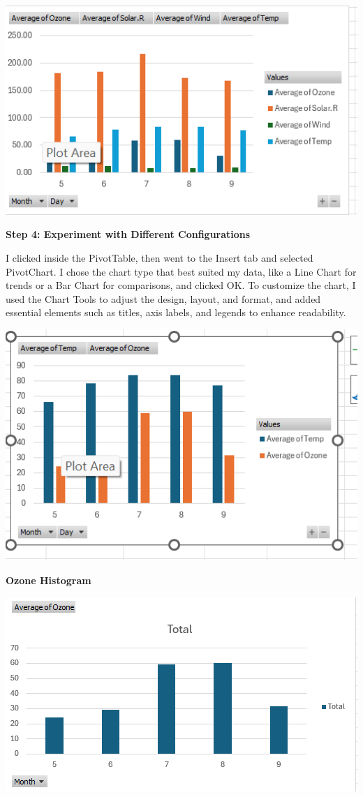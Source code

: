\documentclass[
  letterpaper,
  DIV=11,
  numbers=noendperiod]{scrreprt}
\begin{document}
\includegraphics{pivot_chart_ Olufawo.png}

\textbf{Step 4: Experiment with Different Configurations}

I clicked inside the PivotTable, then went to the Insert tab and
selected PivotChart. I chose the chart type that best suited my data,
like a Line Chart for trends or a Bar Chart for comparisons, and clicked
OK. To customize the chart, I used the Chart Tools to adjust the design,
layout, and format, and added essential elements such as titles, axis
labels, and legends to enhance readability.

\includegraphics{pivotchart_Avg Temp&Ozone_ Olufawo.png}

\textbf{Ozone Histogram}

\includegraphics{hist_ozone_toluwanimi.png}
\end{document}
